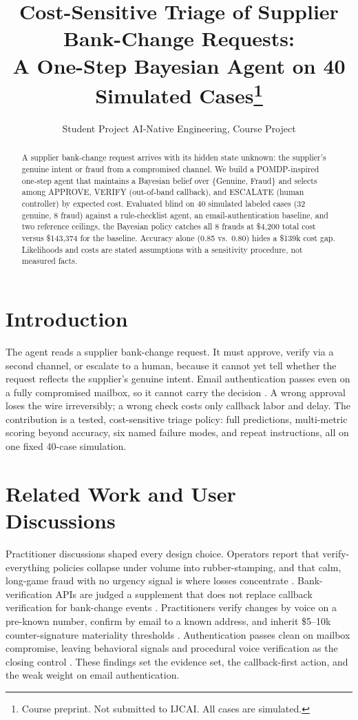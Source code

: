 \documentclass{article}
\title{Cost-Sensitive Triage of Supplier Bank-Change Requests:\\A One-Step Bayesian Agent on 40 Simulated Cases\thanks{Course preprint. Not submitted to IJCAI. All cases are simulated.}}
\author{
    Student Project
    \affiliations
    AI-Native Engineering, Course Project
}
\begin{document}
\maketitle

\begin{abstract}
A supplier bank-change request arrives with its hidden state unknown: the supplier's
genuine intent or fraud from a compromised channel. We build a POMDP-inspired one-step
agent that maintains a Bayesian belief over \{Genuine, Fraud\} and selects among
APPROVE, VERIFY (out-of-band callback), and ESCALATE (human controller) by expected
cost. Evaluated blind on 40 simulated labeled cases (32 genuine, 8 fraud) against a
rule-checklist agent, an email-authentication baseline, and two reference ceilings, the
Bayesian policy catches all 8 frauds at \$4,200 total cost versus \$143,374 for the
baseline. Accuracy alone (0.85 vs.\ 0.80) hides a \$139k cost gap. Likelihoods and
costs are stated assumptions with a sensitivity procedure, not measured facts.
\end{abstract}

\section{Introduction}
The agent reads a supplier bank-change request. It must approve, verify via a second
channel, or escalate to a human, because it cannot yet tell whether the request
reflects the supplier's genuine intent. Email authentication passes even on a fully
compromised mailbox, so it cannot carry the decision \cite{sysadmin-thread}. A wrong
approval loses the wire irreversibly; a wrong check costs only callback labor and
delay. The contribution is a tested, cost-sensitive triage policy: full predictions,
multi-metric scoring beyond accuracy, six named failure modes, and repeat
instructions, all on one fixed 40-case simulation.

\section{Related Work and User Discussions}
Practitioner discussions shaped every design choice. Operators report that
verify-everything policies collapse under volume into rubber-stamping, and that calm,
long-game fraud with no urgency signal is where losses concentrate
\cite{aiagents-thread}. Bank-verification APIs are judged a supplement that does not
replace callback verification for bank-change events \cite{fintechdev-thread}.
Practitioners verify changes by voice on a pre-known number, confirm by email to a
known address, and inherit \$5--10k counter-signature materiality thresholds
\cite{accounting-thread}. Authentication passes clean on mailbox compromise, leaving
behavioral signals and procedural voice verification as the closing control
\cite{sysadmin-thread}. These findings set the evidence set, the callback-first
action, and the weak weight on email authentication.
\end{document}

